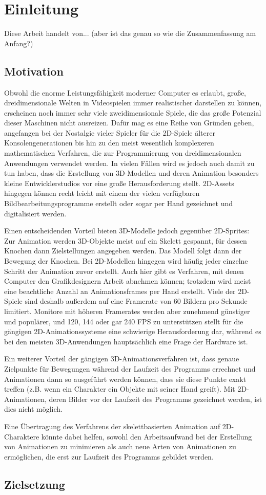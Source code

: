 \chapter{Einleitung}
Diese Arbeit handelt von... (aber ist das genau so wie die Zusammenfassung am Anfang?)

\section{Motivation}
Obwohl die enorme Leistungsfähigkeit moderner Computer es erlaubt, große, dreidimensionale Welten in Videospielen immer realistischer darstellen zu können, erscheinen noch immer sehr viele zweidimensionale Spiele, die das große Potenzial dieser Maschinen nicht ausreizen. Dafür mag es eine Reihe von Gründen geben, angefangen bei der Nostalgie vieler Spieler für die 2D-Spiele älterer Konsolengenerationen bis hin zu den meist wesentlich komplexeren mathematischen Verfahren, die zur Programmierung von dreidimensionalen Anwendungen verwendet werden. In vielen Fällen wird es jedoch auch damit zu tun haben, dass die Erstellung von 3D-Modellen und deren Animation besonders kleine Entwicklerstudios vor eine große Herausforderung stellt. 2D-Assets hingegen können recht leicht mit einem der vielen verfügbaren Bildbearbeitungsprogramme erstellt oder sogar per Hand gezeichnet und digitalisiert werden.

Einen entscheidenden Vorteil bieten 3D-Modelle jedoch gegenüber 2D-Sprites: Zur Animation werden 3D-Objekte meist auf ein Skelett gespannt, für dessen Knochen dann Zielstellungen angegeben werden. Das Modell folgt dann der Bewegung der Knochen. Bei 2D-Modellen hingegen wird häufig jeder einzelne Schritt der Animation zuvor erstellt. Auch hier gibt es Verfahren, mit denen Computer den Grafikdesignern Arbeit abnehmen können; trotzdem wird meist eine beachtliche Anzahl an Animationsframes per Hand erstellt. Viele der 2D-Spiele sind deshalb außerdem auf eine Framerate von 60 Bildern pro Sekunde limitiert. Monitore mit höheren Framerates werden aber zunehmend günstiger und populärer, und 120, 144 oder gar 240 FPS zu unterstützen stellt für die gängigen 2D-Animationssysteme eine schwierige Herausforderung dar, während es bei den meisten 3D-Anwendungen hauptsächlich eine Frage der Hardware ist.

Ein weiterer Vorteil der gängigen 3D-Animationsverfahren ist, dass genaue Zielpunkte für Bewegungen während der Laufzeit des Programms errechnet und Animationen dann so ausgeführt werden können, dass sie diese Punkte exakt treffen (z.B. wenn ein Charakter ein Objekte mit seiner Hand greift). Mit 2D-Animationen, deren Bilder vor der Laufzeit des Programms gezeichnet werden, ist dies nicht möglich.

Eine Übertragung des Verfahrens der skelettbasierten Animation auf 2D-Charaktere könnte dabei helfen, sowohl den Arbeitsaufwand bei der Erstellung von Animationen zu minimieren als auch neue Arten von Animationen zu ermöglichen, die erst zur Laufzeit des Programms gebildet werden.

\section{Zielsetzung}
